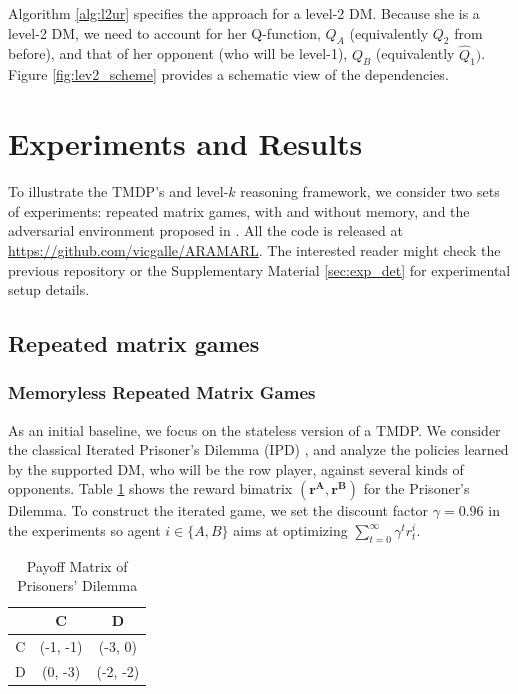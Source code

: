 \documentclass[letterpaper]{article} %
\begin{document}
Algorithm \ref{alg:l2ur} specifies the approach 
for a level-2 DM. Because she is a level-2 DM, we need to account for her Q-function, $Q_A$ (equivalently $Q_2$ from before), and that of her opponent (who will be level-1), $Q_B$ (equivalently $\hat{Q}_1)$. Figure \ref{fig:lev2_scheme} provides a schematic view of the dependencies.



\section{Experiments and Results}



To illustrate the TMDP's and level-$k$ reasoning framework, we consider two sets of experiments: repeated matrix games, with and without memory, and the adversarial environment proposed in \cite{leike2017ai}. All the code is released at \url{https://github.com/vicgalle/ARAMARL}. 
The interested reader might check the previous repository or the Supplementary Material \ref{sec:exp_det} for experimental setup details.

\subsection{Repeated matrix games}

\subsubsection{Memoryless Repeated Matrix Games}

As an initial baseline, we focus on the stateless version of a TMDP. We consider the classical Iterated Prisoner's Dilemma (IPD) \cite{axelrod84}, and 
analyze the policies learned by the supported DM, who will be the row player, against several kinds of opponents. Table \ref{tab:payoffIPD} shows the reward bimatrix $(\mathbf{r^A}, \mathbf{r^B})$ for the Prisoner's Dilemma. To construct the
iterated game, we set the discount factor $\gamma = 0.96$ in the experiments so agent $ i \in \lbrace A, B \rbrace $ aims at optimizing $\sum_{t=0}^{\infty} \gamma^t r^i_{t}$.

\begin{table}[h]
\begin{center}
\begin{tabular}{c|c|c}
\hline
 & C & D \\
\hline
C & (-1, -1) & (-3, 0) \\
\hline
D & (0, -3) & (-2, -2)  \\
\hline
\end{tabular}
\end{center}
\caption{Payoff Matrix of Prisoners' Dilemma}
\label{tab:payoffIPD}
\vspace{-2ex}
\end{table}
\end{document}
